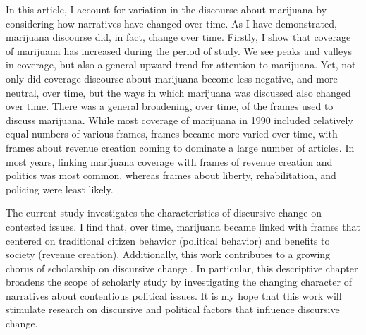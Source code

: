 In this article, I account for variation in the discourse about marijuana by considering how narratives have changed over time. As I have demonstrated, marijuana discourse did, in fact, change over time. Firstly, I show that coverage of marijuana has increased during the period of study. We see peaks and valleys in coverage, but also a general upward trend for attention to marijuana. Yet, not only did coverage discourse about marijuana become less negative, and more neutral, over time, but the ways in which marijuana was discussed also changed over time. There was a general broadening, over time, of the frames used to discuss marijuana. While most coverage of marijuana in 1990 included relatively equal numbers of various frames, frames became more varied over time, with frames about revenue creation coming to dominate a large number of articles. In most years, linking marijuana coverage with frames of revenue creation and politics was most common, whereas frames about liberty, rehabilitation, and policing were least likely. %


The current study investigates the characteristics of discursive change on contested issues. I find that, over time, marijuana became linked with frames that centered on traditional citizen behavior (political behavior) and benefits to society (revenue creation). Additionally, this work contributes to a growing chorus of scholarship on discursive change \citep{bail_2012,bateman_et_al_2019}. In particular, this descriptive chapter broadens the scope of scholarly study by investigating the changing character of narratives about contentious political issues. It is my hope that this work will stimulate research on discursive and political factors that influence discursive change.


